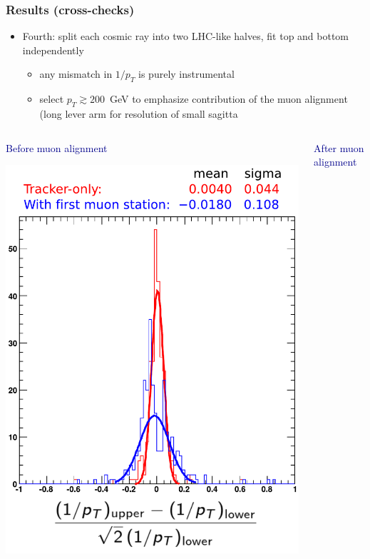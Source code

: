 \documentclass[compress]{beamer}
\begin{document}
\begin{frame}
\frametitle{Results (cross-checks)}

\begin{itemize}
\item Fourth: split each cosmic ray into two LHC-like halves, fit top and bottom independently
\begin{itemize}
\item any mismatch in $1/p_T$ is purely instrumental
\item select $p_T \gtrsim 200$~GeV to emphasize contribution of the muon alignment (long lever arm for resolution of small sagitta
\end{itemize}
\end{itemize}

\vspace{-0.5 cm}
\begin{columns}
\begin{center}
\textcolor{darkblue}{Before muon alignment}

\includegraphics[width=\linewidth]{without_alignment.pdf}
\end{center}
\begin{center}
\textcolor{darkblue}{After muon alignment}


\end{center}
\end{columns}
\end{frame}
\end{document}
